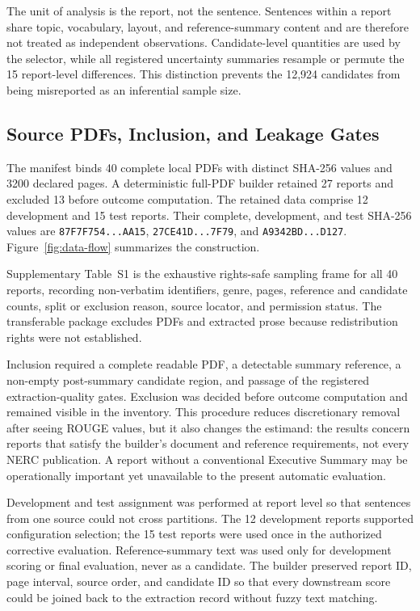 \documentclass[applsci,article,submit,moreauthors]{Definitions/mdpi}
\begin{document}
The unit of analysis is the report, not the sentence. Sentences within a report share topic, vocabulary, layout, and reference-summary content and are therefore not treated as independent observations. Candidate-level quantities are used by the selector, while all registered uncertainty summaries resample or permute the 15 report-level differences. This distinction prevents the 12,924 candidates from being misreported as an inferential sample size.

\subsection{Source PDFs, Inclusion, and Leakage Gates}

The manifest binds 40 complete local PDFs with distinct SHA-256 values and 3200 declared pages. A deterministic full-PDF builder retained 27 reports and excluded 13 before outcome computation. The retained data comprise 12 development and 15 test reports. Their complete, development, and test SHA-256 values are \texttt{87F7F754...AA15}, \texttt{27CE41D...7F79}, and \texttt{A9342BD...D127}. Figure~\ref{fig:data-flow} summarizes the construction.

Supplementary Table~S1 is the exhaustive rights-safe sampling frame for all 40 reports, recording non-verbatim identifiers, genre, pages, reference and candidate counts, split or exclusion reason, source locator, and permission status. The transferable package excludes PDFs and extracted prose because redistribution rights were not established.

Inclusion required a complete readable PDF, a detectable summary reference, a non-empty post-summary candidate region, and passage of the registered extraction-quality gates. Exclusion was decided before outcome computation and remained visible in the inventory. This procedure reduces discretionary removal after seeing ROUGE values, but it also changes the estimand: the results concern reports that satisfy the builder's document and reference requirements, not every NERC publication. A report without a conventional Executive Summary may be operationally important yet unavailable to the present automatic evaluation.

Development and test assignment was performed at report level so that sentences from one source could not cross partitions. The 12 development reports supported configuration selection; the 15 test reports were used once in the authorized corrective evaluation. Reference-summary text was used only for development scoring or final evaluation, never as a candidate. The builder preserved report ID, page interval, source order, and candidate ID so that every downstream score could be joined back to the extraction record without fuzzy text matching.
\end{document}
